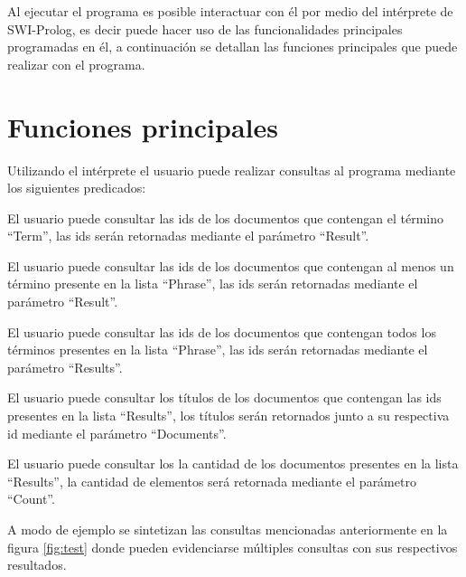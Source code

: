 \documentclass[letterpaper,12pt]{report}
\begin{document}
Al ejecutar el programa es posible interactuar con él por medio del intérprete de SWI-Prolog, es decir puede hacer uso de las funcionalidades principales programadas en él, a continuación se detallan las funciones principales que puede realizar con el programa.

\section {Funciones principales}

Utilizando el intérprete el usuario puede realizar consultas al programa mediante los siguientes predicados:

\begin{description}[align=left]

\item [1.- singleTermQuery(Term, Result):] 
    El usuario puede consultar las ids de los documentos que contengan el término ``Term'', las ids serán retornadas mediante el parámetro ``Result''. 

\item [2.- bestMatch(Phrase, Result):]
    El usuario puede consultar las ids de los documentos que contengan al menos un término presente en la lista ``Phrase'', las ids serán retornadas mediante el parámetro ``Result''.

\item [3.- exactMatch(Phrase, Results):]
    El usuario puede consultar las ids de los documentos que contengan todos los términos presentes en la lista ``Phrase'', las ids serán retornadas mediante el parámetro ``Results''.

\item [4.- documents(Results, Documents):]
    El usuario puede consultar los títulos de los documentos que contengan las ids presentes en la lista ``Results'', los títulos serán retornados junto a su respectiva id mediante el parámetro ``Documents''.

\item [5.- numDocuments(Results, Count):]
    El usuario puede consultar los la cantidad de los documentos presentes en la lista ``Results'', la cantidad de elementos será retornada mediante el parámetro ``Count''.

\end{description}

A modo de ejemplo se sintetizan las consultas mencionadas anteriormente en la figura \ref{fig:test} donde pueden evidenciarse múltiples consultas con sus respectivos resultados.
\end{document}
